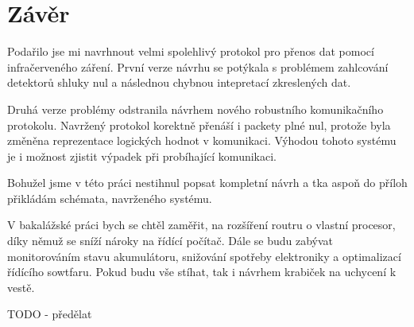 \chapter{Závěr}

Podařilo jse mi navrhnout velmi spolehlivý protokol pro přenos dat pomocí infračerveného záření. První verze návrhu se potýkala s problémem zahlcování detektorů shluky nul a následnou chybnou intepretací zkreslených dat.

Druhá verze problémy odstranila návrhem nového robustního komunikačního protokolu. Navržený protokol korektně přenáší i packety plné nul, protože byla změněna reprezentace logických hodnot v komunikaci. Výhodou tohoto systému je i možnost zjistit výpadek při probíhající komunikaci.

Bohužel jsme v této práci nestihnul popsat kompletní návrh a tka aspoň do příloh přikládám schémata, navrženého systému.

V bakalážské práci bych se chtěl zaměřit, na rozšíření routru o vlastní procesor, díky němuž se sníží nároky na řídící počítač. Dále se budu zabývat monitorováním stavu akumulátoru, snižování spotřeby elektroniky a optimalizací řídícího sowtfaru. Pokud budu vše stíhat, tak i návrhem krabiček na uchycení k vestě.

TODO - předělat
